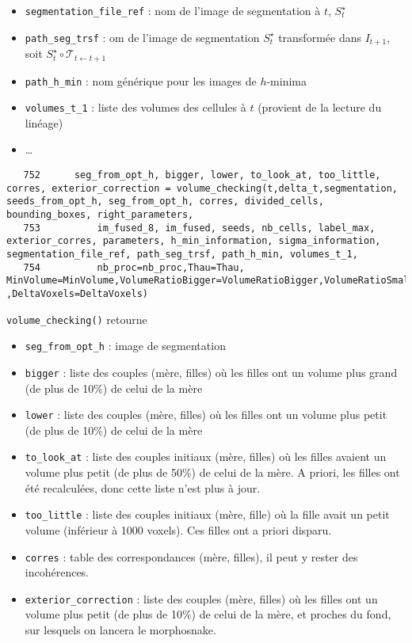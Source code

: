 \documentclass{article}
\def \mycolor {red}
\begin{document}
\begin{itemize}
\item \verb|segmentation_file_ref| : nom de l'image de segmentation \`a $t$, $S^{\star}_t$
\item \verb|path_seg_trsf| : om de l'image de segmentation $S^{\star}_t$ transform\'ee dans $I_{t+1}$, soit
$S^{\star}_t \circ \mathcal{T}_{t \leftarrow t+1}$
\item \verb|path_h_min| : nom g\'en\'erique pour les images de $h$-minima
\item \verb|volumes_t_1| : liste des volumes des cellules \`a $t$ (provient de la lecture du lin\'eage)
\item \ldots
\end{itemize}
\color{black}
\begin{verbatim} 
   752	    seg_from_opt_h, bigger, lower, to_look_at, too_little, corres, exterior_correction = volume_checking(t,delta_t,segmentation, seeds_from_opt_h, seg_from_opt_h, corres, divided_cells, bounding_boxes, right_parameters, 
   753	        im_fused_8, im_fused, seeds, nb_cells, label_max, exterior_corres, parameters, h_min_information, sigma_information, segmentation_file_ref, path_seg_trsf, path_h_min, volumes_t_1, 
   754	        nb_proc=nb_proc,Thau=Thau, MinVolume=MinVolume,VolumeRatioBigger=VolumeRatioBigger,VolumeRatioSmaller=VolumeRatioSmaller,MorphosnakeIterations=MorphosnakeIterations,NIterations=NIterations ,DeltaVoxels=DeltaVoxels)
\end{verbatim}
\color{\mycolor}
\texttt{volume\_checking()} retourne
\begin{itemize}
\itemsep -1ex
\item \verb|seg_from_opt_h| : image de segmentation
\item \verb|bigger| : liste des couples (m\`ere, filles) o\`u les filles ont un volume plus grand (de plus de 10\%) de celui de la m\`ere
\item \verb|lower| : liste des couples (m\`ere, filles) o\`u les filles ont un volume plus petit (de plus de 10\%) de celui de la m\`ere
\item \verb|to_look_at| : liste des couples initiaux (m\`ere, filles) o\`u les filles avaient un volume plus petit (de plus de 50\%) de celui de la m\`ere. A priori, les filles ont \'et\'e recalcul\'ees, donc cette liste n'est plus \`a jour.
\item \verb|too_little| : liste des couples initiaux (m\`ere, fille) o\`u la fille avait un petit volume (inf\'erieur \`a 1000 voxels). Ces filles ont a priori disparu.
\item \verb|corres| : table des correspondances (m\`ere, filles), il peut y rester des incoh\'erences.
\item \verb|exterior_correction| : liste des couples (m\`ere, filles) o\`u les filles ont un volume plus petit (de plus de 10\%) de celui de la m\`ere, et proches du fond, sur lesquels on lancera le morphosnake.
\end{itemize}
\end{document}
